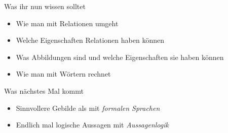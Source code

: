 



\begin{frame}	
	\begin{block}{Was ihr nun wissen solltet}
		\begin{itemize}
			\item Wie man mit Relationen umgeht
			\item Welche Eigenschaften Relationen haben können
			\item Was Abbildungen sind und welche Eigenschaften sie haben können
			\item Wie man mit Wörtern rechnet
		\end{itemize}
	\end{block}
	
	\begin{block}{Was nächstes Mal kommt}
		\begin{itemize}
			\item Sinnvollere Gebilde als  mit \emph{formalen Sprachen}
			\item Endlich mal logische Aussagen mit \emph{Aussagenlogik}
		\end{itemize}
	\end{block}
\end{frame}


\slideThanks

